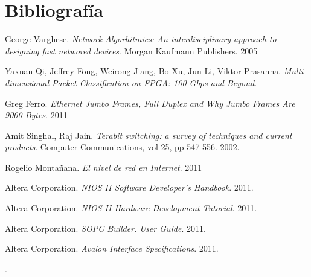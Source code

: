 \chapter{Bibliografía}
\begin{thebibliography}{10}
 George Varghese. \textit{Network Algorhitmics: An interdisciplinary approach to designing fast networed devices}. Morgan Kaufmann Publishers. 2005 

Yaxuan Qi, Jeffrey Fong, Weirong Jiang, Bo Xu, Jun Li, Viktor Prasanna. \textit{Multi-dimensional Packet Classification on FPGA: 100 Gbps and Beyond}.

 Greg Ferro. \textit{Ethernet Jumbo Frames, Full Duplex and Why Jumbo Frames Are 9000 Bytes}. 2011

Amit Singhal, Raj Jain. \textit{Terabit switching: a survey of techniques and current products}. Computer Communications, vol 25, pp 547-556. 2002.


 Rogelio Montañana. \textit{El nivel de red en Internet}. 2011

 Altera Corporation. \textit{NIOS II Software Developer's Handbook}. 2011.

 Altera Corporation. \textit{NIOS II Hardware Development Tutorial}. 2011.

 Altera Corporation. \textit{SOPC Builder. User Guide}. 2011.

 Altera Corporation. \textit{Avalon Interface Specifications}. 2011.


\end{thebibliography}.
